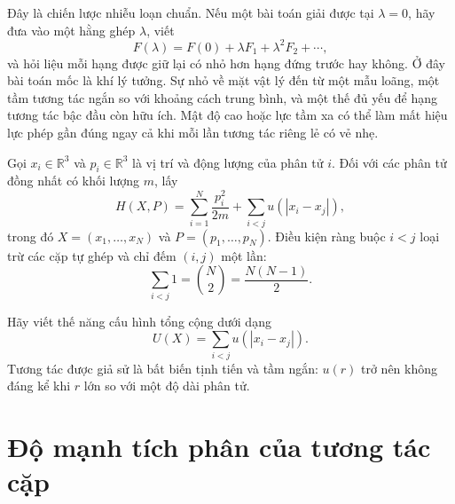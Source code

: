 Đây là chiến lược nhiễu loạn chuẩn. Nếu một bài toán giải được tại \(\lambda=0\), hãy đưa vào một hằng ghép \(\lambda\), viết \begin{equation}
 F(\lambda)=F(0)+\lambda F_1+\lambda^2F_2+\cdots,
 \label{eq:sm6-perturbative-template}
\end{equation} và hỏi liệu mỗi hạng được giữ lại có nhỏ hơn hạng đứng trước hay không. Ở đây bài toán mốc là khí lý tưởng. Sự nhỏ về mặt vật lý đến từ một mẫu loãng, một tầm tương tác ngắn so với khoảng cách trung bình, và một thế đủ yếu để hạng tương tác bậc đầu còn hữu ích. Mật độ cao hoặc lực tầm xa có thể làm mất hiệu lực phép gần đúng ngay cả khi mỗi lần tương tác riêng lẻ có vẻ nhẹ.

Gọi \(x_i\in\mathbb R^3\) và \(p_i\in\mathbb R^3\) là vị trí và động lượng của phân tử \(i\). Đối với các phân tử đồng nhất có khối lượng \(m\), lấy \begin{equation}
 H(X,P)=
 \sum_{i=1}^{N}\frac{p_i^2}{2m}
 +\sum_{i<j}u\!\left(|x_i-x_j|\right),
 \label{eq:sm6-interacting-hamiltonian}
\end{equation} trong đó \(X=(x_1,\ldots,x_N)\) và \(P=(p_1,\ldots,p_N)\). Điều kiện ràng buộc \(i<j\) loại trừ các cặp tự ghép và chỉ đếm \((i,j)\) một lần: \begin{equation}
 \sum_{i<j}1=\binom{N}{2}=\frac{N(N-1)}{2}.
 \label{eq:sm6-pair-count}
\end{equation}

\begin{classroomqa}  \end{classroomqa}

Hãy viết thế năng cấu hình tổng cộng dưới dạng \begin{equation}
 U(X)=\sum_{i<j}u\!\left(|x_i-x_j|\right).
 \label{eq:sm6-total-potential}
\end{equation} Tương tác được giả sử là bất biến tịnh tiến và tầm ngắn: \(u(r)\) trở nên không đáng kể khi \(r\) lớn so với một độ dài phân tử.

\section{Độ mạnh tích phân của tương tác cặp}

